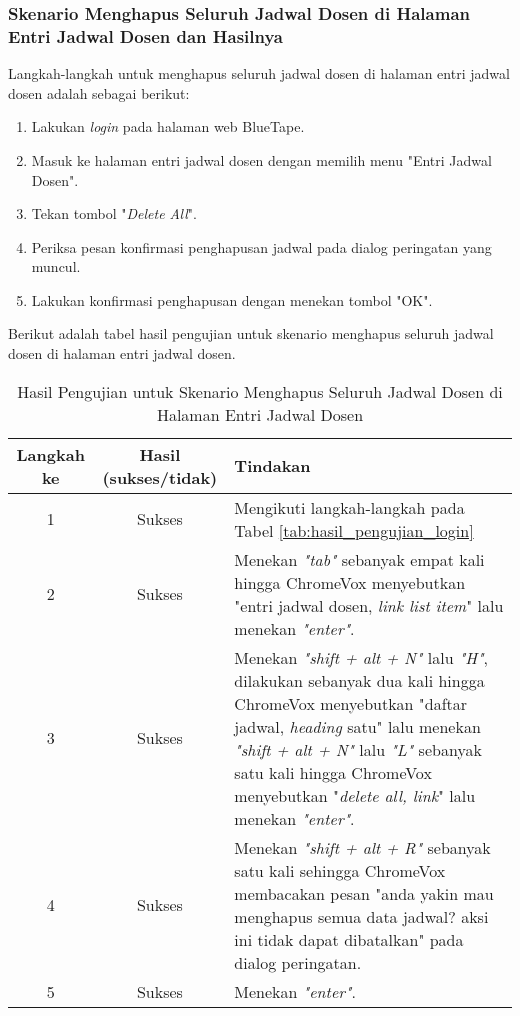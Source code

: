 \subsubsection{Skenario Menghapus Seluruh Jadwal Dosen di Halaman Entri Jadwal Dosen dan Hasilnya}
\label{subsubsec:skenario_menghapus_seluruh_jadwal_dosen_di_halaman_entri_jadwal_dosen}
Langkah-langkah untuk menghapus seluruh jadwal dosen di halaman entri jadwal dosen adalah sebagai berikut:

\begin{enumerate}
    \item Lakukan \textit{login} pada halaman web BlueTape.
    \item Masuk ke halaman entri jadwal dosen dengan memilih menu "Entri Jadwal Dosen".
    \item Tekan tombol "\textit{Delete All}".
    \item Periksa pesan konfirmasi penghapusan jadwal pada dialog peringatan yang muncul.
    \item Lakukan konfirmasi penghapusan dengan menekan tombol "OK".
\end{enumerate}

Berikut adalah tabel hasil pengujian untuk skenario menghapus seluruh jadwal dosen di halaman entri jadwal dosen.

\begin{table}[H]
    \centering 
    \caption{Hasil Pengujian untuk Skenario Menghapus Seluruh Jadwal Dosen di Halaman Entri Jadwal Dosen}
    \label{tab:hasil_pengujian_menghapus_seluruh_jadwal_dosen_di_halaman_entri_jadwal_dosen}
    \begin{tabular}{|c|c|p{10cm}|}
        \toprule
        Langkah ke & Hasil (sukses/tidak) & Tindakan \\

        \midrule
        1 & Sukses & Mengikuti langkah-langkah pada Tabel \ref{tab:hasil_pengujian_login} \\
        2 & Sukses & Menekan \textit{"tab"} sebanyak empat kali hingga ChromeVox menyebutkan "entri jadwal dosen, \textit{link list item}" lalu menekan \textit{"enter"}. \\
        3 & Sukses & Menekan \textit{"shift + alt + N"} lalu \textit{"H"}, dilakukan sebanyak dua kali hingga ChromeVox menyebutkan "daftar jadwal, \textit{heading} satu" lalu menekan \textit{"shift + alt + N"} lalu \textit{"L"} sebanyak satu kali hingga ChromeVox menyebutkan "\textit{delete all, link}" lalu menekan \textit{"enter"}. \\
        4 & Sukses & Menekan \textit{"shift + alt + R"} sebanyak satu kali sehingga ChromeVox membacakan pesan "anda yakin mau menghapus semua data jadwal? aksi ini tidak dapat dibatalkan" pada dialog peringatan. \\
        5 & Sukses & Menekan \textit{"enter"}. \\

        \bottomrule

    \end{tabular}
\end{table}

